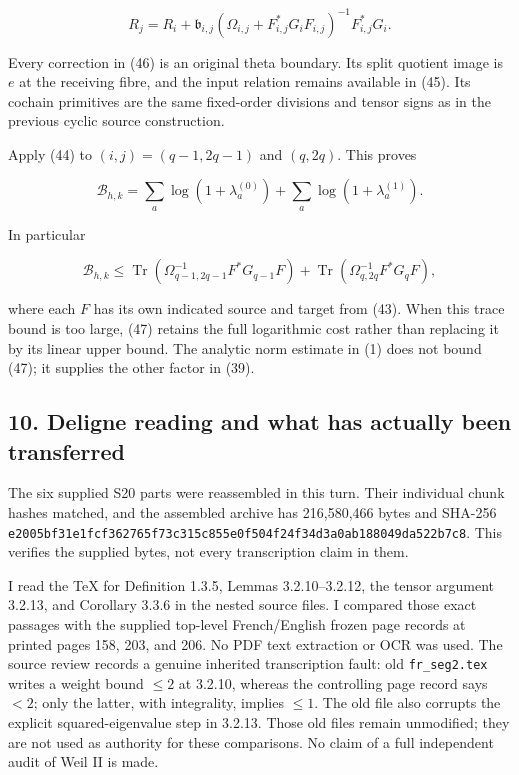 \[
 R_j=R_i+
 \mathfrak b_{i,j}
 (\Omega_{i,j}+F_{i,j}^*G_iF_{i,j})^{-1}F_{i,j}^*G_i.                    \tag{46}
\]

Every correction in (46) is an original theta boundary. Its split quotient image is \(e\) at the receiving fibre, and the input relation remains available in (45). Its cochain primitives are the same fixed-order divisions and tensor signs as in the previous cyclic source construction.

Apply (44) to \((i,j)=(q-1,2q-1)\) and \((q,2q)\). This proves

\[
 \boxed{\mathcal B_{h,k}
 =\sum_a\log(1+\lambda_a^{(0)})
   +\sum_a\log(1+\lambda_a^{(1)}).}                                    \tag{47}
\]

In particular

\[
 \mathcal B_{h,k}\le
 \operatorname{Tr}(\Omega_{q-1,2q-1}^{-1}F^*G_{q-1}F)
 +\operatorname{Tr}(\Omega_{q,2q}^{-1}F^*G_qF),                          \tag{48}
\]

where each \(F\) has its own indicated source and target from (43). When this trace bound is too large, (47) retains the full logarithmic cost rather than replacing it by its linear upper bound. The analytic norm estimate in (1) does not bound (47); it supplies the other factor in (39).

\subsection{10. Deligne reading and what has actually been transferred}\label{zlm:endpoint-arithmetic_original--deligne-reading-and-what-has-actually-been-transferred}

The six supplied S20 parts were reassembled in this turn. Their individual chunk hashes matched, and the assembled archive has 216,580,466 bytes and SHA-256 \nolinkurl{e2005bf31e1fcf362765f73c315c855e0f504f24f34d3a0ab188049da522b7c8}. This verifies the supplied bytes, not every transcription claim in them.

I read the TeX for Definition 1.3.5, Lemmas 3.2.10--3.2.12, the tensor argument 3.2.13, and Corollary 3.3.6 in the nested source files. I compared those exact passages with the supplied top-level French/English frozen page records at printed pages 158, 203, and 206. No PDF text extraction or OCR was used. The source review records a genuine inherited transcription fault: old \nolinkurl{fr_seg2.tex} writes a weight bound \(\le2\) at 3.2.10, whereas the controlling page record says \(<2\); only the latter, with integrality, implies \(\le1\). The old file also corrupts the explicit squared-eigenvalue step in 3.2.13. Those old files remain unmodified; they are not used as authority for these comparisons. No claim of a full independent audit of Weil II is made.

